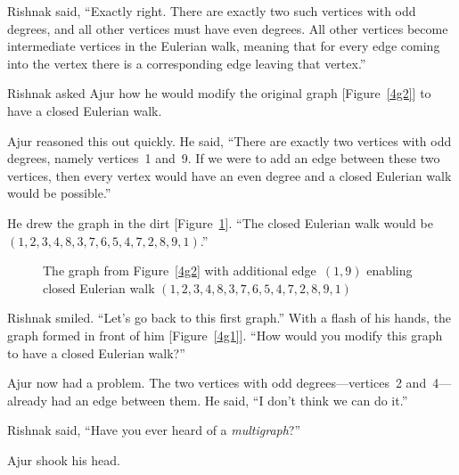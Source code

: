 Rishnak said, ``Exactly right. There are exactly two such vertices with odd degrees, and all other vertices must have even degrees. All other vertices become intermediate vertices in the Eulerian walk, meaning that for every edge coming into the vertex there is a corresponding edge leaving that vertex.''

Rishnak asked Ajur how he would modify the original graph [Figure~\ref{4g2}] to have a closed Eulerian walk.

Ajur reasoned this out quickly. He said, ``There are exactly two vertices with odd degrees, namely vertices~1 and~9. If we were to add an edge between these two vertices, then every vertex would have an even degree and a closed Eulerian walk would be possible.''

He drew the graph in the dirt [Figure~\ref{4g255}]. ``The closed Eulerian walk would be $(1,2,3,4,8,3,7,6,5,4,7,2,8,9,1)$.''

\begin{figure}
\begin{center}
\caption{The graph from Figure~\ref{4g2} with additional edge~$(1,9)$ enabling closed Eulerian walk $(1,2,3,4,8,3,7,6,5,4,7,2,8,9,1)$}\label{4g255}
\end{center}
\end{figure}

Rishnak smiled. ``Let's go back to this first graph.'' With a flash of his hands, the graph formed in front of him [Figure~\ref{4g1}]. ``How would you modify this graph to have a closed Eulerian walk?''

Ajur now had a problem. The two vertices with odd degrees---vertices~2 and~4---already had an edge between them. He said, ``I don't think we can do it.''

Rishnak said, ``Have you ever heard of a \textit{multigraph}?''

Ajur shook his head.

